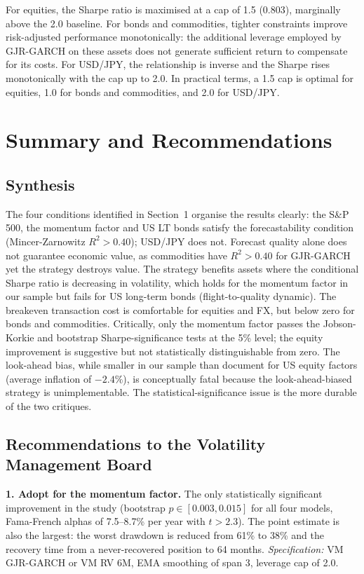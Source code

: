 \documentclass[12pt, a4paper]{article}
\begin{document}
\noindent For equities, the Sharpe ratio is maximised at a cap of 1.5 (0.803), marginally
above the 2.0 baseline. For bonds and commodities, tighter constraints improve risk-adjusted
performance monotonically: the additional leverage employed by GJR-GARCH on these assets
does not generate sufficient return to compensate for its costs. For USD/JPY, the
relationship is inverse and the Sharpe rises monotonically with the cap up to 2.0. In
practical terms, a 1.5 cap is optimal for equities, 1.0 for bonds and commodities, and 2.0
for USD/JPY.

\section{Summary and Recommendations}

\subsection{Synthesis}

The four conditions identified in Section~1 organise the results clearly: the S\&P 500, the
momentum factor and US LT bonds satisfy the forecastability condition (Mincer-Zarnowitz
$R^2>0.40$); USD/JPY does not. Forecast quality alone does not guarantee economic value, as
commodities have $R^2>0.40$ for GJR-GARCH yet the strategy destroys value. The strategy
benefits assets where the conditional Sharpe ratio is decreasing in volatility, which holds
for the momentum factor in our sample but fails for US long-term bonds (flight-to-quality
dynamic). The breakeven transaction cost is comfortable for equities and FX, but below zero
for bonds and commodities. Critically, only the momentum factor passes the Jobson-Korkie and
bootstrap Sharpe-significance tests at the 5\% level; the equity improvement is suggestive
but not statistically distinguishable from zero. The look-ahead bias, while smaller in our
sample than \citet{liu2019} document for US equity factors (average inflation of $-2.4\%$),
is conceptually fatal because the look-ahead-biased strategy is unimplementable. The
statistical-significance issue is the more durable of the two critiques.

\subsection{Recommendations to the Volatility Management Board}

\textbf{1. Adopt for the momentum factor.} The only statistically significant improvement
in the study (bootstrap $p\in[0.003,0.015]$ for all four models, Fama-French alphas of
7.5--8.7\% per year with $t>2.3$). The point estimate is also the largest: the worst
drawdown is reduced from 61\% to 38\% and the recovery time from a never-recovered position
to 64 months. \textit{Specification:} VM GJR-GARCH or VM RV 6M, EMA smoothing of span 3,
leverage cap of 2.0.
\end{document}
